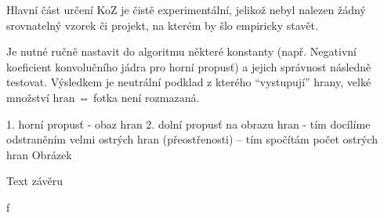 Hlavní část určení KoZ je čistě experimentální, jelikož nebyl nalezen žádný srovnatelný vzorek či projekt, na kterém by šlo empiricky stavět.

Je nutné ručně nastavit do algoritmu některé konstanty (např. Negativní koeficient konvolučního jádra pro horní propusť) a jejich správnost následně testovat. Výsledkem je neutrální podklad z kterého “vystupují” hrany, velké množství hran ⇔ fotka není rozmazaná.


1. horní propusť - obaz hran
2. dolní propusť na obrazu hran - tím docílíme odstraněním velmi ostrých hran (přeostřenosti)
-- tím spočítám počet ostrých hran
Obrázek 







Text závěru


f